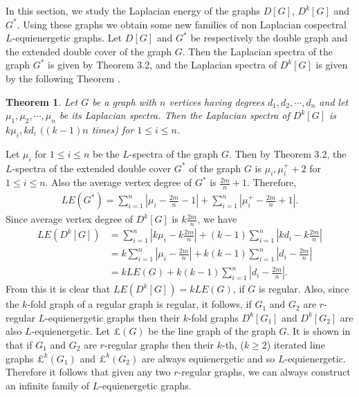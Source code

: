 \documentclass[12pt,a4paper]{amsart}
\newtheorem{theorem}{Theorem}[section]
\theoremstyle{theorem}
\theoremstyle{definition}
\numberwithin{equation}{section} \makeatletter
\begin{document}
In this section, we study the Laplacian energy of the graphs $D[G]$, $D^k[G]$ and $G^*$. Using these graphs we obtain some new families of non Laplacian cospectral $L$-equienergetic graphs.
Let $D[G]$ and $G^*$ be respectively the double graph and the extended double cover of the graph $G$. Then the Laplacian spectra of the graph $G^*$ is given by Theorem 3.2, and the Laplacian spectra of $D^k[G]$ is given by the following Theorem \cite{ms}.
\begin{theorem}
Let $G$ be a graph with $n$ vertices having degrees $d_1, d_2, \cdots, d_n$ and let $\mu_1, \mu_2, \cdots, \mu_n$ be its Laplacian spectra. Then the Laplacian spectra of $D^k[G]$ is $k\mu_i, kd_i$ $((k-1)n$ times) for $1\leq i\leq n$.
\end{theorem}
Let $\mu_i$ for $1\leq i \leq n$ be the $L$-spectra of the graph $G$. Then by Theorem 3.2, the $L$-spectra of the extended double cover $G^*$ of the graph $G$ is $\mu_i, \mu_i^{+}+2$ for $1\leq i\leq n$. Also the average vertex degree of $G^*$ is $\frac{2m}{n}+1$. Therefore,
\begin{align*}
LE(G^*)=\sum\limits_{i=1}^{n}|\mu_i-\frac{2m}{n}-1|+\sum\limits_{i=1}^{n}|\mu_i^{+}-\frac{2m}{n}+1|.
\end{align*}
Since average vertex degree of $D^k[G]$ is $k\frac{2m}{n}$, we have
\begin{align*}
LE(D^k[G])&=\sum\limits_{i=1}^{n}|k\mu_i-k\frac{2m}{n}|+(k-1)\sum\limits_{i=1}^{n}|kd_i-k\frac{2m}{n}|\\&
=k\sum\limits_{i=1}^{n}|\mu_i-\frac{2m}{n}|+k(k-1)\sum\limits_{i=1}^{n}|d_i-\frac{2m}{n}|\\&
=kLE(G)+k(k-1)\sum\limits_{i=1}^{n}|d_i-\frac{2m}{n}|.
\end{align*}
\indent From this it is clear that $LE(D^k[G])=k LE(G)$, if $G$ is regular. Also, since the $k$-fold graph of a regular graph is regular, it follows, if $G_1$ and $G_2$ are $r$-regular $L$-equienergetic graphs then their $k $-fold graphs $D^k[G_1]$ and $D^k[G_2]$ are also $L$-equienergetic. Let $\pounds(G)$ be the line graph of the graph $G$. It is shown in \cite{rgra} that if $G_1$ and $G_2$ are $r$-regular graphs then their $k$-th, ($k\geq 2$) iterated line graphs $\pounds^k(G_1)$ and $\pounds^k(G_2)$ are always equienergetic and so $L$-equienergetic. Therefore it follows that given any two $r$-regular graphs, we can always construct an infinite family of $L$-equienergetic graphs.\\
\end{document}
